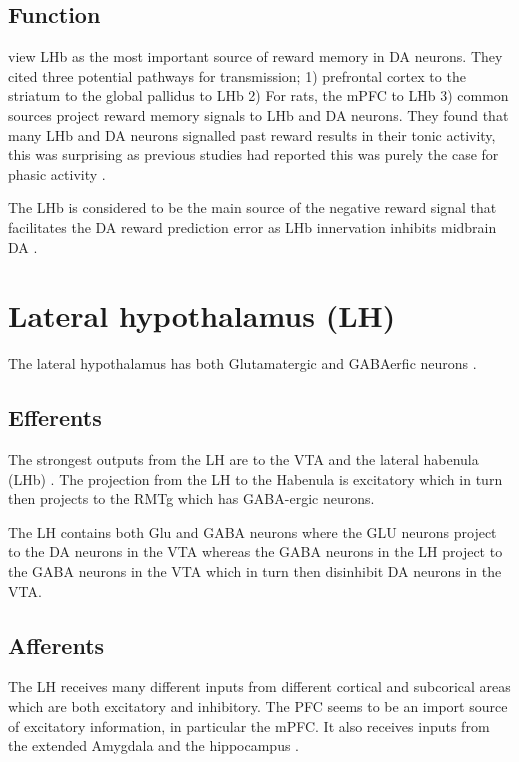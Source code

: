 \documentclass[12pt,a4paper]{article}
\begin{document}
\subsection{Function}
\citet{Bromberg-Martin2010} view LHb as the most important
source of reward memory in DA neurons. They cited three potential pathways
for transmission; 1) prefrontal cortex to the striatum to the global
pallidus to LHb 2) For rats, the mPFC to LHb 3) common sources project
reward memory signals to LHb and DA neurons. They found that many LHb
and DA neurons signalled past reward results in their tonic activity,
this was surprising as previous studies had reported this was purely
the case for phasic activity .

The LHb is considered to be the main source of the negative reward signal
that facilitates the DA reward prediction error as LHb innervation
inhibits midbrain
DA \citep{Shen2012, Shabel2012, Matsumoto2007, Barrot2012}.








\section{Lateral hypothalamus (LH)}
The lateral hypothalamus has both Glutamatergic and GABAerfic neurons \citep{Stanley2011}.

\subsection{Efferents}
The strongest outputs from the LH are to the VTA and the lateral
habenula (LHb) \citep{Stuber2016}.  The projection from the LH to the
Habenula is excitatory \citep{Poller2013} which in turn then projects
to the RMTg which has GABA-ergic neurons.

The LH contains both Glu and GABA neurons where the GLU neurons
project to the DA neurons in the VTA whereas the GABA neurons in the
LH project to the GABA neurons in the VTA which in turn then
disinhibit DA neurons in the VTA.


\subsection{Afferents}
The LH receives many different inputs from different cortical and
subcorical areas which are both excitatory and inhibitory. The PFC
seems to be an import source of excitatory information, in particular
the mPFC. It also receives inputs from the extended Amygdala and the
hippocampus \citep{Stuber2016}.
\end{document}
